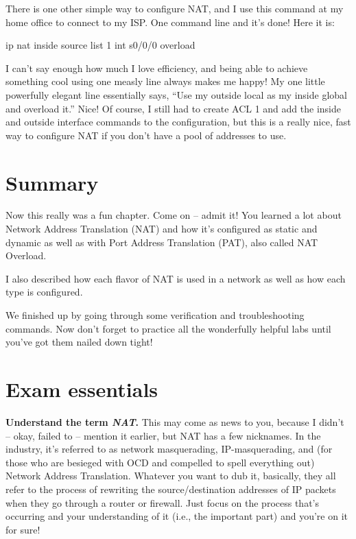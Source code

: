 There is one other simple way to configure NAT, and I use this command
at my home office to connect to my ISP. One command line and it's done!
Here it is:

\begin{cli}
ip nat inside source list 1 int s0/0/0 overload
\end{cli}

I can't say enough how much I love efficiency, and being able to achieve
something cool using one measly line always makes me happy! My one
little powerfully elegant line essentially says, ``Use my outside local
as my inside global and overload it.'' Nice! Of course, I still had to
create ACL 1 and add the inside and outside interface commands to the
configuration, but this is a really nice, fast way to configure NAT if
you don't have a pool of addresses to use.



\section{Summary}

Now this really was a fun chapter. Come on -- admit it! You learned a lot
about Network Address Translation (NAT) and how it's configured as
static and dynamic as well as with Port Address Translation (PAT), also
called NAT Overload.

I also described how each flavor of NAT is used in a network as well as
how each type is configured.

We finished up by going through some verification and troubleshooting
commands. Now don't forget to practice all the wonderfully helpful labs
until you've got them nailed down tight!



\section{Exam essentials}

\textbf{Understand the term \emph{NAT}.} This may come as news to you,
because I didn't -- okay, failed to -- mention it earlier, but NAT has a
few nicknames. In the industry, it's referred to as network
masquerading, IP-masquerading, and (for those who are besieged with OCD
and compelled to spell everything out) Network Address Translation.
Whatever you want to dub it, basically, they all refer to the process of
rewriting the source/destination addresses of IP packets when they go
through a router or firewall. Just focus on the process that's occurring
and your understanding of it (i.e., the important part) and you're on it
for sure!

